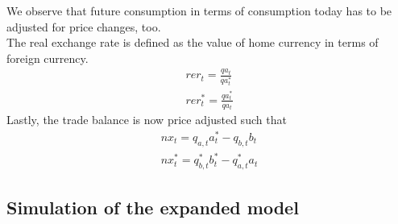 \documentclass{article}
\begin{document}
We observe that future consumption in terms of consumption today has to be adjusted for price changes, too. \\
The real exchange rate is defined as the value of home currency in terms of foreign currency.
\begin{align}
rer_t = \frac{qa_t}{qa_t^*} \\
rer_t^* = \frac{qa_t^*}{qa_t}
\end{align}
Lastly, the trade balance is now price adjusted such that
\begin{align}
nx_t = q_{a,t} a_t^* - q_{b,t} b_t \\
nx_t^* = q_{b,t}^* b_t^* - q_{a,t}^* a_t
\end{align}


\subsection{Simulation of the expanded model}
\end{document}
